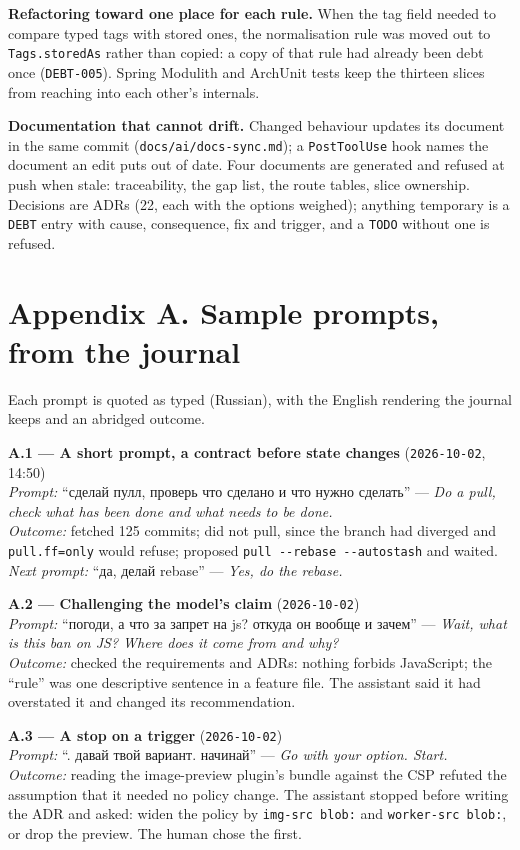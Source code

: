 \documentclass[11pt]{article}
\newcommand{\ru}[1]{{\cyrfont #1}}
\begin{document}
\textbf{Refactoring toward one place for each rule.} When the tag field needed to compare typed tags
with stored ones, the normalisation rule was moved out to \texttt{Tags.storedAs} rather than copied:
a copy of that rule had already been debt once (\texttt{DEBT-005}). Spring Modulith and ArchUnit
tests keep the thirteen slices from reaching into each other's internals.

\textbf{Documentation that cannot drift.} Changed behaviour updates its document in the same commit
(\texttt{docs/ai/docs-sync.md}); a \texttt{PostToolUse} hook names the document an edit puts out of
date. Four documents are generated and refused at push when stale: traceability, the gap list, the
route tables, slice ownership. Decisions are ADRs (22, each with the options weighed); anything
temporary is a \texttt{DEBT} entry with cause, consequence, fix and trigger, and a \texttt{TODO}
without one is refused.

\clearpage
\appendix
\section*{Appendix A. Sample prompts, from the journal}

Each prompt is quoted as typed (Russian), with the English rendering the journal keeps and an
abridged outcome.

\textbf{A.1 --- A short prompt, a contract before state changes} (\texttt{2026-10-02}, 14:50)\\
\emph{Prompt:} ``\ru{сделай пулл, проверь что сделано и что нужно сделать}'' --- \emph{Do a pull, check
what has been done and what needs to be done.}\\
\emph{Outcome:} fetched 125 commits; did not pull, since the branch had diverged and
\texttt{pull.ff=only} would refuse; proposed \texttt{pull -{}-rebase -{}-autostash} and waited.
\emph{Next prompt:} ``\ru{да, делай rebase}'' --- \emph{Yes, do the rebase.}

\textbf{A.2 --- Challenging the model's claim} (\texttt{2026-10-02})\\
\emph{Prompt:} ``\ru{погоди, а что за запрет на js? откуда он вообще и зачем}'' --- \emph{Wait, what is
this ban on JS? Where does it come from and why?}\\
\emph{Outcome:} checked the requirements and ADRs: nothing forbids JavaScript; the ``rule'' was one
descriptive sentence in a feature file. The assistant said it had overstated it and changed its
recommendation.

\textbf{A.3 --- A stop on a trigger} (\texttt{2026-10-02})\\
\emph{Prompt:} ``\ru{1. давай твой вариант. начинай}'' --- \emph{Go with your option. Start.}\\
\emph{Outcome:} reading the image-preview plugin's bundle against the CSP refuted the assumption that
it needed no policy change. The assistant stopped before writing the ADR and asked: widen the policy
by \texttt{img-src blob:} and \texttt{worker-src blob:}, or drop the preview. The human chose the
first.
\end{document}
